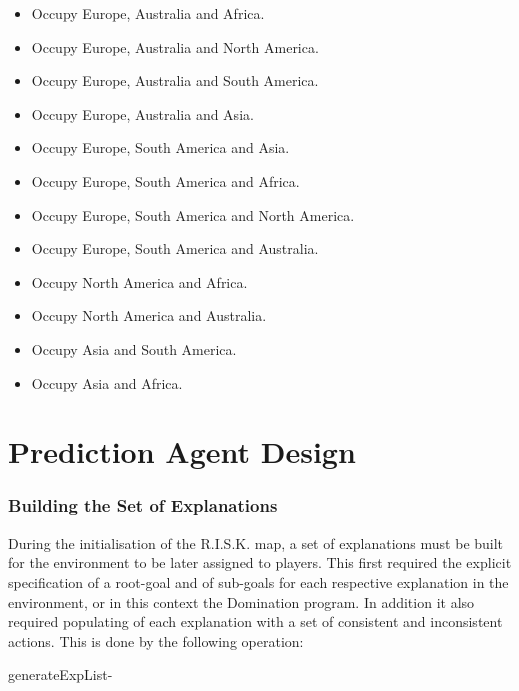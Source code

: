 \documentclass[parskip]{cs4rep}
\begin{document}
\begin{itemize}
\item
Occupy Europe, Australia and Africa.
\item
Occupy Europe, Australia and North America.
\item
Occupy Europe, Australia and South America.
\item
Occupy Europe, Australia and Asia.
\item
Occupy Europe, South America and Asia.
\item
Occupy Europe, South America and Africa.
\item
Occupy Europe, South America and North America.
\item
Occupy Europe, South America and Australia.
\item
Occupy North America and Africa.
\item
Occupy North America and Australia.
\item
Occupy Asia and South America.
\item
Occupy Asia and Africa.
\end{itemize}

\section{Prediction Agent Design}

\subsubsection{Building the Set of Explanations}

During the initialisation of the R.I.S.K. map, a set of explanations must be built for the environment to be later assigned to players. This first required the explicit specification of a root-goal and of sub-goals for each respective explanation in the environment, or in this context the Domination program. In addition it also required populating of each explanation with a set of consistent and inconsistent actions. This is done by the following operation:

\begin{pseudocode}[ruled]{generateExpList}{-}
\begin{algorithm}[H]
\end{algorithm}
\end{pseudocode}
\end{document}
